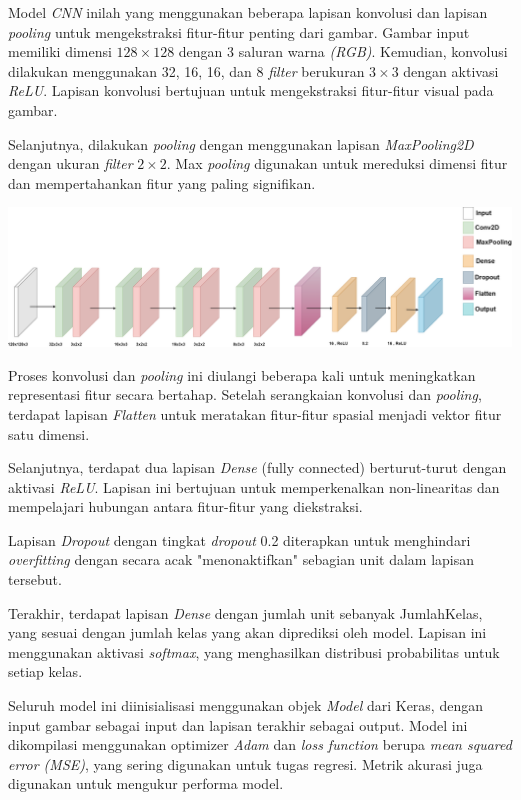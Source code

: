 Model \textit{CNN} inilah yang menggunakan beberapa lapisan konvolusi dan lapisan \textit{pooling} untuk mengekstraksi fitur-fitur penting dari gambar. Gambar input memiliki dimensi $128 \times 128$ dengan 3 saluran warna \textit{(RGB)}. Kemudian, konvolusi dilakukan menggunakan 32, 16, 16, dan 8 \textit{filter} berukuran $3 \times 3$ dengan aktivasi \textit{ReLU}. Lapisan konvolusi bertujuan untuk mengekstraksi fitur-fitur visual pada gambar.

Selanjutnya, dilakukan \textit{pooling} dengan menggunakan lapisan \textit{MaxPooling2D} dengan ukuran \textit{filter} $2 \times 2$. Max \textit{pooling} digunakan untuk mereduksi dimensi fitur dan mempertahankan fitur yang paling signifikan.

\begin{center}
	\includegraphics[width=1.0\linewidth]{gambar/bener/Arsitektur_CNN2_Revisi.png}
	\label{fig:layerCNN}
\end{center}

Proses konvolusi dan \textit{pooling} ini diulangi beberapa kali untuk meningkatkan representasi fitur secara bertahap. Setelah serangkaian konvolusi dan \textit{pooling}, terdapat lapisan \textit{Flatten} untuk meratakan fitur-fitur spasial menjadi vektor fitur satu dimensi.

Selanjutnya, terdapat dua lapisan \textit{Dense} (fully connected) berturut-turut dengan aktivasi \textit{ReLU}. Lapisan ini bertujuan untuk memperkenalkan non-linearitas dan mempelajari hubungan antara fitur-fitur yang diekstraksi.

Lapisan \textit{Dropout} dengan tingkat \textit{dropout} 0.2 diterapkan untuk menghindari \textit{overfitting} dengan secara acak "menonaktifkan" sebagian unit dalam lapisan tersebut.

Terakhir, terdapat lapisan \textit{Dense} dengan jumlah unit sebanyak JumlahKelas, yang sesuai dengan jumlah kelas yang akan diprediksi oleh model. Lapisan ini menggunakan aktivasi \textit{softmax}, yang menghasilkan distribusi probabilitas untuk setiap kelas.

Seluruh model ini diinisialisasi menggunakan objek \textit{Model} dari Keras, dengan input gambar sebagai input dan lapisan terakhir sebagai output. Model ini dikompilasi menggunakan optimizer \textit{Adam} dan \textit{loss function} berupa \textit{mean squared error (MSE)}, yang sering digunakan untuk tugas regresi. Metrik akurasi juga digunakan untuk mengukur performa model.

